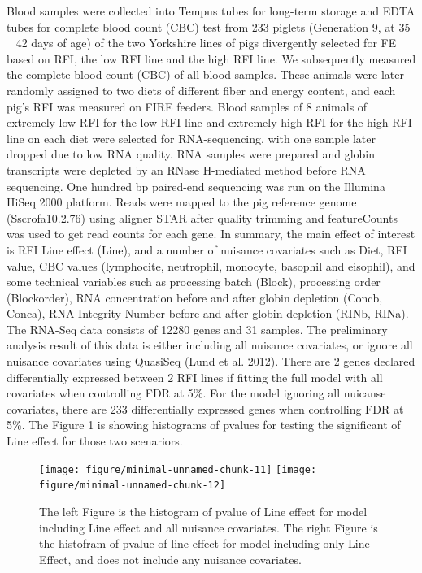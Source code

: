 \documentclass[12pt, letter]{article}\usepackage[]{graphicx}\usepackage[]{color}
\newenvironment{knitrout}{}{} %
\begin{document}
Blood samples were collected into Tempus 
tubes for long-term storage and EDTA tubes for 
complete blood count (CBC) test from 233 piglets 
(Generation 9, at 35 ~ 42 days of age) of the two 
Yorkshire lines of pigs divergently selected for FE 
based on RFI, the low RFI line and the high RFI line. 
We subsequently measured the complete blood count 
(CBC) of all blood samples. These animals were later 
randomly assigned to two diets of different fiber and 
energy content, and each pig’s RFI was measured on 
FIRE feeders. Blood samples of 8 animals of 
extremely low RFI for the low RFI line and 
extremely high RFI for the high RFI line on each diet 
were selected for RNA-sequencing, with one sample 
later dropped due to low RNA quality. RNA samples 
were prepared and globin transcripts were depleted 
by an RNase H-mediated method before RNA 
sequencing. One hundred bp paired-end sequencing 
was run on the Illumina HiSeq 2000 platform. Reads 
were mapped to the pig reference genome 
(Sscrofa10.2.76) using aligner STAR after quality 
trimming and featureCounts was used to get read 
counts for each gene. In summary, the main effect of interest is RFI Line effect (Line), and a number of nuisance covariates such as Diet, RFI value, 
CBC values (lymphocite, neutrophil, monocyte, basophil and eisophil), and some technical variables such as processing batch (Block), processing order (Blockorder), RNA concentration before and after globin depletion (Concb, Conca), RNA Integrity Number before and after globin depletion (RINb, RINa). The RNA-Seq data consists of 12280 genes and 31 samples. 
The preliminary analysis result of this data is either including all nuisance covariates, or ignore all nuisance covariates using QuasiSeq (Lund et al. 2012). There are 2 genes declared differentially expressed between 2 RFI lines if fitting the full model with all covariates when controlling FDR at 5\%.  For the model ignoring all nuicanse covariates, there are 233 differentially expressed genes when controlling FDR at 5\%.   The Figure 1  is showing histograms of pvalues for testing the significant of Line effect for those two scenariors. 
\begin{knitrout}
\color{fgcolor}\begin{figure}[H]


{\centering \texttt{[image: figure/minimal-unnamed-chunk-11]} 
\texttt{[image: figure/minimal-unnamed-chunk-12]} 

}

\caption[The left Figure is the histogram of pvalue of Line effect for model including Line effect and all nuisance covariates]{The left Figure is the histogram of pvalue of Line effect for model including Line effect and all nuisance covariates. The right Figure is the histofram of pvalue of line effect for model including only Line Effect, and does not include any nuisance covariates.\label{fig:unnamed-chunk-1}}
\end{figure}


\end{knitrout}
\end{document}
